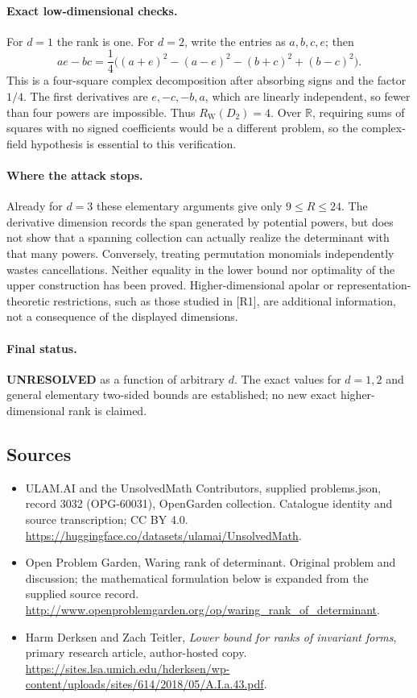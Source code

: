 \documentclass[11pt,a4paper]{article}
\begin{document}
\paragraph{Exact low-dimensional checks.}
For $d=1$ the rank is one. For $d=2$, write the entries as $a,b,c,e$;
then
\[
 ae-bc=\frac14\bigl((a+e)^2-(a-e)^2
                     -(b+c)^2+(b-c)^2\bigr).
\]
This is a four-square complex decomposition after absorbing signs and
the factor $1/4$. The first derivatives are $e,-c,-b,a$, which are
linearly independent, so fewer than four powers are impossible. Thus
$R_{\mathrm W}(D_2)=4$. Over $\mathbb R$, requiring sums of squares
with no signed coefficients would be a different problem, so the
complex-field hypothesis is essential to this verification.

\paragraph{Where the attack stops.}
Already for $d=3$ these elementary arguments give only $9\le R\le24$.
The derivative dimension records the span generated by potential powers,
but does not show that a spanning collection can actually realize the
determinant with that many powers. Conversely, treating permutation
monomials independently wastes cancellations. Neither equality in the
lower bound nor optimality of the upper construction has been proved.
Higher-dimensional apolar or representation-theoretic restrictions,
such as those studied in [R1], are additional information, not a
consequence of the displayed dimensions.

\paragraph{Final status.}
\textbf{UNRESOLVED} as a function of arbitrary $d$. The exact values
for $d=1,2$ and general elementary two-sided bounds are established;
no new exact higher-dimensional rank is claimed.

\subsection{Sources}
\begin{itemize}
\item[S1] ULAM.AI and the UnsolvedMath Contributors, supplied problems.json, record 3032 (OPG-60031), OpenGarden collection. Catalogue identity and source transcription; CC BY 4.0.
\url{https://huggingface.co/datasets/ulamai/UnsolvedMath}.
\item[S2] Open Problem Garden, Waring rank of determinant. Original problem and discussion; the mathematical formulation below is expanded from the supplied source record.
\url{http://www.openproblemgarden.org/op/waring_rank_of_determinant}.

\item[R1] Harm Derksen and Zach Teitler, \emph{Lower bound for ranks of
invariant forms}, primary research article, author-hosted copy.
\url{https://sites.lsa.umich.edu/hderksen/wp-content/uploads/sites/614/2018/05/A.I.a.43.pdf}.

\end{itemize}
\end{document}
